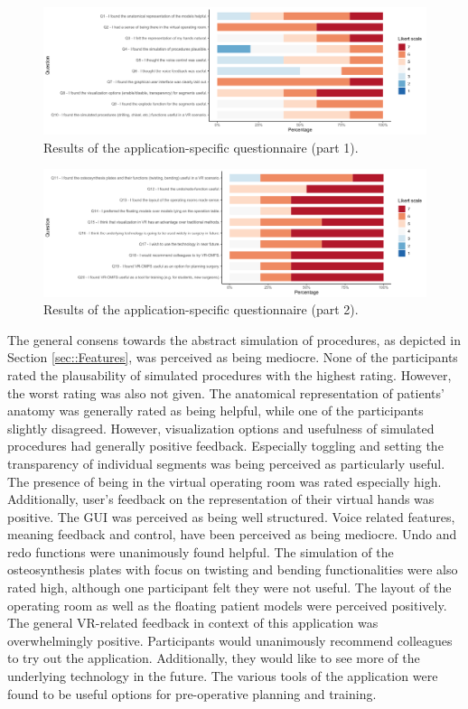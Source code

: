 \begin{figure}
    \centering
    \includegraphics[width=\linewidth]{images/evaluation/VR-SET1.png}
    \caption{\label{fig::vrSet1}Results of the application-specific questionnaire (part 1).}
\end{figure}

\begin{figure}
    \centering
    \includegraphics[width=\linewidth]{images/evaluation/VR-SET2.png}
    \caption{\label{fig::vrSet2}Results of the application-specific questionnaire (part 2).}
\end{figure}

The general consens towards the abstract simulation of procedures,
as depicted in Section \ref{sec::Features}, was perceived as 
being mediocre. None of the participants rated the plausability
of simulated procedures with the highest rating.
However, the worst rating was also not given. The anatomical 
representation of patients' anatomy was generally rated as being
helpful, while one of the participants slightly disagreed. 
However, visualization options and usefulness of simulated procedures
had generally positive feedback. Especially toggling and setting the 
transparency of individual segments was being perceived as particularly
useful.
The presence of being in the virtual operating room was rated
especially high. Additionally, user's feedback on the representation
of their virtual hands was positive. 
The GUI was perceived as being well structured.
Voice related features, meaning feedback and control, have been
perceived as being mediocre. 
Undo and redo functions were unanimously found helpful.
The simulation of the osteosynthesis plates with focus on
twisting and bending functionalities were also rated high,
although one participant felt they were not useful.
The layout of the operating room as well as the floating patient
models were perceived positively. 
\\ The general VR-related feedback in context of this application
was overwhelmingly positive. 
Participants would unanimously recommend colleagues to try
out the application. Additionally, they would like to see
more of the underlying technology in the future.
The various tools of the application were found to be 
useful options for pre-operative planning and training.

